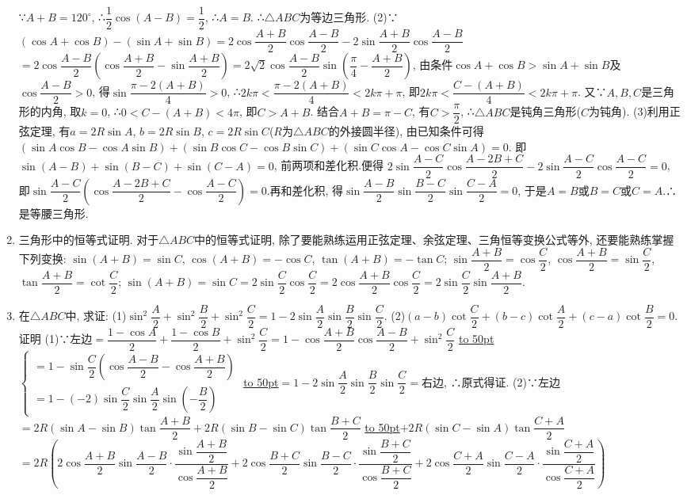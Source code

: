 \documentclass[10pt,a4paper]{article}
\newcommand{\blank}[1]{\underline{\hbox to #1pt{}}}
\begin{document}
\begin{enumerate}[1.]
∵$A+B=120^\circ$, ∴$\dfrac 12\cos (A-B)=\dfrac 12$, ∴$A=B$.
∴$\triangle ABC$为等边三角形.
(2)∵$(\cos A+\cos B)-(\sin A+\sin B)=2\cos \dfrac{A+B}2\cos \dfrac{A-B}2-2\sin \dfrac{A+B}2\cos \dfrac{A-B}2$
$=2\cos \dfrac{A-B}2(\cos \dfrac{A+B}2-\sin \dfrac{A+B}2)=2\sqrt 2\cos \dfrac{A-B}2\sin (\dfrac{\pi}4-\dfrac{A+B}2)$,
由条件$\cos A+\cos B>\sin A+\sin B$及$\cos \dfrac{A-B}2>0$, 得$\sin \dfrac{\pi -2(A+B)}4>0$,
∴$2k\pi <\dfrac{\pi -2(A+B)}4<2k\pi +\pi$, 即$2k\pi <\dfrac{C-(A+B)}4<2k\pi +\pi$.
又∵$A,B,C$是三角形的内角, 取$k=0$, ∴$0<C-(A+B)<4\pi$, 即$C>A+B$.
结合$A+B=\pi -C$, 有$C>\dfrac{\pi}2$, ∴$\triangle ABC$是钝角三角形($C$为钝角).
(3)利用正弦定理, 有$a=2R\sin A$, $b=2R\sin B$, $c=2R\sin C$($R$为$\triangle ABC$的外接圆半径), 由已知条件可得$(\sin A\cos B-\cos A\sin B)+(\sin B\cos C-\cos B\sin C)+(\sin C\cos A-\cos C\sin A)=0$.
即$\sin (A-B)+\sin (B-C)+\sin (C-A)=0$, 前两项和差化积.便得
$2\sin \dfrac{A-C}2\cos \dfrac{A-2B+C}2-2\sin \dfrac{A-C}2\cos \dfrac{A-C}2=0$,
即$\sin \dfrac{A-C}2(\cos \dfrac{A-2B+C}2-\cos \dfrac{A-C}2)=0$.再和差化积,
得$\sin \dfrac{A-B}2\sin \dfrac{B-C}2\sin \dfrac{C-A}2=0$, 于是$A=B$或$B=C$或$C=A$.∴是等腰三角形.
\item 三角形中的恒等式证明.
对于$\triangle ABC$中的恒等式证明, 除了要能熟练运用正弦定理、余弦定理、三角恒等变换公式等外, 还要能熟练掌握下列变换:
$\sin (A+B)=\sin C$, $\cos (A+B)=-\cos C$, $\tan (A+B)=-\tan C$;
$\sin \dfrac{A+B}2=\cos \dfrac C2$, $\cos \dfrac{A+B}2=\sin \dfrac C2$, $\tan \dfrac{A+B}2=\cot \dfrac C2$;
$\sin (A+B)=\sin C=2\sin \dfrac C2\cos \dfrac C2=2\cos \dfrac{A+B}2\cos \dfrac C2=2\sin \dfrac C2\sin \dfrac{A+B}2$.
\item 在$\triangle ABC$中, 求证:
(1)$\sin ^2\dfrac A2+\sin ^2\dfrac B2+\sin ^2\dfrac C2=1-2\sin \dfrac A2\sin \dfrac B2\sin \dfrac C2$.
(2)$(a-b)\cot \dfrac C2+(b-c)\cot \dfrac A2+(c-a)\cot \dfrac B2=0$.
证明  (1)∵左边$=\dfrac{1-\cos A}2+\dfrac{1-\cos B}2+\sin ^2\dfrac C2=1-\cos \dfrac{A+B}2\cos \dfrac{A-B}2+\sin ^2\dfrac C2$
\blank{50}$\begin{cases} =1-\sin \dfrac C2(\cos \dfrac{A-B}2-\cos \dfrac{A+B}2) \\ =1-(-2)\sin \dfrac C2\sin \dfrac A2\sin (-\dfrac B2) \end{cases}$
\blank{50}$=1-2\sin \dfrac A2\sin \dfrac B2\sin \dfrac C2=$右边,
∴原式得证.
(2)∵左边$=2R(\sin A-\sin B)\tan \dfrac{A+B}2+2R(\sin B-\sin C)\tan \dfrac{B+C}2$
\blank{50}$+2R(\sin C-\sin A)\tan \dfrac{C+A}2$
$=2R(2\cos \dfrac{A+B}2\sin \dfrac{A-B}2\cdot \dfrac{\sin \dfrac{A+B}2}{\cos \dfrac{A+B}2}+2\cos \dfrac{B+C}2\sin \dfrac{B-C}2\cdot \dfrac{\sin \dfrac{B+C}2}{\cos \dfrac{B+C}2}+2\cos \dfrac{C+A}2\sin \dfrac{C-A}2\cdot \dfrac{\sin \dfrac{C+A}2}{\cos \dfrac{C+A}2})$

\end{enumerate}
\end{document}
